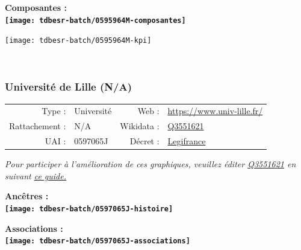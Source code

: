 \documentclass[12pt,french,]{article}
\begin{document}
\hrulefill

\begin{center} \bf Composantes : \\  
\texttt{[image: tdbesr-batch/0595964M-composantes]} \end{center}

\begin{center}\texttt{[image: tdbesr-batch/0595964M-kpi]} \end{center}\checkoddpage

\ifoddpage ~\newpage \fi   

\hypertarget{universituxe9-de-lille-na}{%
\subsubsection{Université de Lille
(N/A)}\label{universituxe9-de-lille-na}}

\begin{tabular*}{\textwidth}{rp{5cm}rl}  
\hline  
Type : & Université & Web : &\href{https://www.univ-lille.fr/}{https://www.univ-lille.fr/} \\  
Rattachement : & N/A & Wikidata : & \href{https://www.wikidata.org/entity/Q3551621}{Q3551621} \\  
UAI : & 0597065J & Décret : & \href{https://www.legifrance.gouv.fr/affichTexte.do?cidTexte=JORFTEXT000035543008}{Legifrance} \\  
\hline  
\end{tabular*}

\textit{\scriptsize Pour participer à l'amélioration de ces graphiques, veuillez éditer  \href{https://www.wikidata.org/entity/Q3551621}{Q3551621}  en suivant \href{https://github.com/cpesr/wikidataESR/blob/master/Rmd/wikidataESR.md}{ce guide.}}

\vspace{1cm}  
\begin{minipage}[b]{0.50\textwidth}\begin{center} \bf Ancêtres : \\  
\texttt{[image: tdbesr-batch/0597065J-histoire]} \end{center}\end{minipage}\begin{minipage}[b]{0.50\textwidth}\begin{center} \bf Associations : \\  
\texttt{[image: tdbesr-batch/0597065J-associations]} \end{center}\end{minipage}
\end{document}
